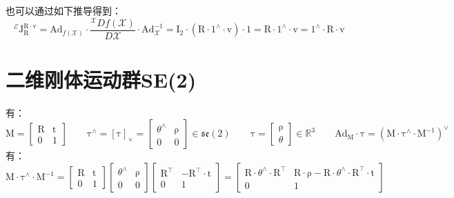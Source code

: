 \documentclass[12pt, onecolumn]{article}
\newcommand\normf{\fangsong}
\newcommand\skewmat[1]{\left[ #1 \right]_\times}
\newcommand\liehat[1]{#1^{\land}}
\newcommand\lievee[1]{#1^\vee}
\newcommand\bsm[1]{\boldsymbol{\mathrm{#1}}}
\begin{document}
	也可以通过如下推导得到：
	\begin{equation}
	^\mathcal{E}\bsm{J}_{\bsm{R}}^{\bsm{R}\cdot\bsm{v}}=
	\bsm{Ad}_{f(\mathcal{X})}\cdot\frac{{^\mathcal{X}Df(\mathcal{X})}}{D\mathcal{X}}
		\cdot\bsm{Ad}_{\mathcal{X}}^{-1}
		=\bsm{I}_2\cdot\left(\bsm{R}\cdot\liehat{{1}}\cdot\bsm{v} \right) \cdot 1
		=\bsm{R}\cdot\liehat{{1}}\cdot\bsm{v}=\liehat{{1}}\cdot\bsm{R}\cdot\bsm{v}
	\end{equation}
	
	
	\section{\normf 二维刚体运动群SE(2)}
	有：
	\begin{equation}
	\bsm{M}=\begin{bmatrix}
	\bsm{R}&\bsm{t}\\
	\bsm{0}&1
	\end{bmatrix}
	\qquad
	\liehat{\bsm{\tau}}=\skewmat{\bsm{\tau}}=\begin{bmatrix}
	\liehat{\theta}&\bsm{\rho}\\
	\bsm{0}&0
	\end{bmatrix}\in\mathfrak{se}(2)
	\qquad
	\bsm{\tau}=\begin{bmatrix}
	\bsm{\rho}\\\theta
	\end{bmatrix}\in\mathbb{R}^3
	\qquad
	\bsm{Ad}_{\bsm{M}}\cdot\bsm{\tau}=\lievee{\left(\bsm{M}\cdot\liehat{\bsm{\tau}}\cdot\bsm{M}^{-1} \right) }
	\end{equation}
	有：
	\begin{equation}	
	\bsm{M}\cdot\liehat{\bsm{\tau}}\cdot\bsm{M}^{-1}=
	\begin{bmatrix}
		\bsm{R}&\bsm{t}\\
		\bsm{0}&1
		\end{bmatrix}\begin{bmatrix}
			\liehat{\theta}&\bsm{\rho}\\
			\bsm{0}&0
			\end{bmatrix}	\begin{bmatrix}
					\bsm{R}^\top&-\bsm{R}^\top\cdot\bsm{t}\\
					\bsm{0}&1
					\end{bmatrix}=\begin{bmatrix}
					\bsm{R}\cdot\liehat{\theta}\cdot\bsm{R}^\top&\bsm{R}\cdot\bsm{\rho}-\bsm{R}\cdot\liehat{\theta}\cdot\bsm{R}^\top\cdot\bsm{t}\\
					\bsm{0}&1
					\end{bmatrix}
	\end{equation}
\end{document}
